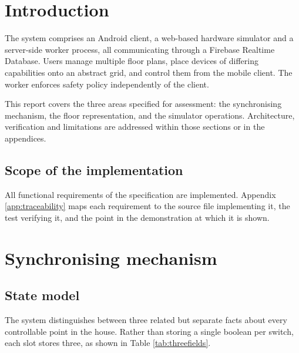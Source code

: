 \documentclass[11pt,a4paper]{article}
\begin{document}

\tableofcontents
\thispagestyle{fancy}
\newpage

\section{Introduction}

The system comprises an Android client, a web-based hardware simulator and a
server-side worker process, all communicating through a Firebase Realtime
Database. Users manage multiple floor plans, place devices of differing
capabilities onto an abstract grid, and control them from the mobile client.
The worker enforces safety policy independently of the client.

This report covers the three areas specified for assessment: the synchronising
mechanism, the floor representation, and the simulator operations. Architecture,
verification and limitations are addressed within those sections or in the
appendices.

\subsection{Scope of the implementation}

All functional requirements of the specification are implemented. Appendix
\ref{app:traceability} maps each requirement to the source file implementing it,
the test verifying it, and the point in the demonstration at which it is shown.

\section{Synchronising mechanism}

\subsection{State model}

The system distinguishes between three related but separate facts about every
controllable point in the house. Rather than storing a single boolean per
switch, each slot stores three, as shown in Table \ref{tab:threefields}.
\end{document}
